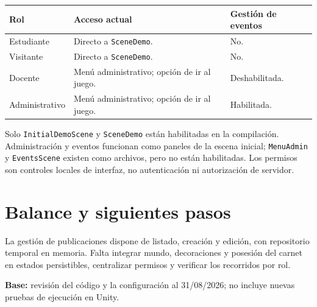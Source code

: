 \documentclass[11pt,letterpaper]{article}
\newcommand{\code}[1]{\nolinkurl{#1}}
\begin{document}
\begin{tabularx}{\textwidth}{@{}>{\raggedright\arraybackslash}p{2.7cm}Y >{\raggedright\arraybackslash}p{2.6cm}@{}}
\toprule
\textbf{Rol} & \textbf{Acceso actual} & \textbf{Gestión de eventos} \\
\midrule
Estudiante & Directo a \code{SceneDemo}. & No. \\
Visitante & Directo a \code{SceneDemo}. & No. \\
Docente & Menú administrativo; opción de ir al juego. & Deshabilitada. \\
Administrativo & Menú administrativo; opción de ir al juego. & Habilitada. \\
\bottomrule
\end{tabularx}

Solo \code{InitialDemoScene} y \code{SceneDemo} están habilitadas en la compilación. Administración y eventos funcionan como paneles de la escena inicial; \code{MenuAdmin} y \code{EventsScene} existen como archivos, pero no están habilitadas. Los permisos son controles locales de interfaz, no autenticación ni autorización de servidor.

\section{Balance y siguientes pasos}
La gestión de publicaciones dispone de listado, creación y edición, con repositorio temporal en memoria. Falta integrar mundo, decoraciones y posesión del carnet en estados persistibles, centralizar permisos y verificar los recorridos por rol.

\vfill
{\footnotesize\color{teal}\textbf{Base:} revisión del código y la configuración al 31/08/2026; no incluye nuevas pruebas de ejecución en Unity.\par}
\end{document}
